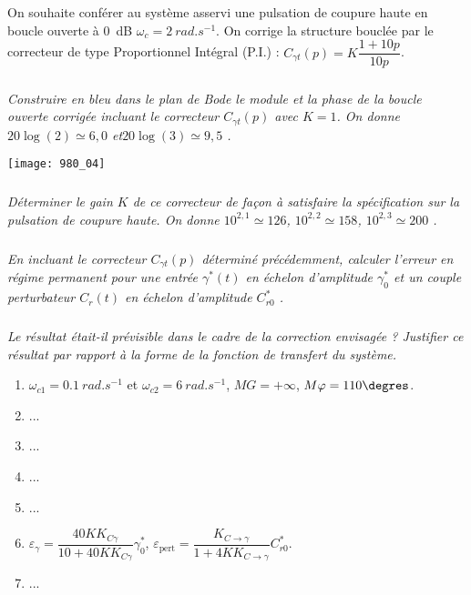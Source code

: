 On souhaite conférer au système asservi une pulsation de coupure haute en boucle ouverte à \SI{0}{dB}
$\omega_c = \SI{2}{rad.s^{-1}}$. On corrige la structure bouclée par le correcteur de type Proportionnel Intégral (P.I.) :
$C_{\gamma t}(p)=K\dfrac{1+10p}{10p}$.


\subparagraph{}
\textit{Construire en bleu dans le plan de Bode le module et la phase de la boucle ouverte corrigée incluant le correcteur 
$C_{\gamma t} (p)$ avec $K = 1$. On donne $20 \log( 2) \simeq  6,0$ et$ 20 \log(3) \simeq 9,5$ .}
\ifprof
\begin{corrige}
\end{corrige}
\else
\fi


\begin{center}
\texttt{[image: 980\_04]}%
\end{center}


\subparagraph{}
\textit{Déterminer le gain $K$ de ce correcteur de façon à satisfaire la spécification sur la pulsation de
coupure haute. On donne $10^{2,1}\simeq  126$, $10^{2,2}\simeq  158$, $10^{2,3}\simeq  200$ .}
\ifprof
\begin{corrige}
\end{corrige}
\else
\fi



\subparagraph{}
\textit{En incluant le correcteur $C_{\gamma t} (p)$ déterminé précédemment, calculer l'erreur en régime
permanent pour une entrée $\gamma ^* (t)$ en échelon d’amplitude $\gamma^*_0$ et un couple perturbateur $C_r (t)$ en
échelon d’amplitude $C^*_{r0}$ .}
\ifprof
\begin{corrige}
\end{corrige}
\else
\fi


\subparagraph{}
\textit{Le résultat était-il prévisible dans le cadre de la correction envisagée ? 
Justifier ce résultat par rapport à la forme de la fonction de transfert du système.}
\ifprof
\begin{corrige}
\end{corrige}
\else
\fi

\begin{enumerate}
\item $\omega_{c1} = \SI{0,1}{rad.s^{-1}}$ et $\omega_{c2} = \SI{6}{rad.s^{-1}}$, $MG=+\infty$, $M\varphi = 110\degres$.
\item ...
\item ...
\item ...
\item ...
\item $\varepsilon_{\gamma} = \dfrac{40 K K_{C \gamma}}{10+40 K K_{C \gamma}}\gamma_{0}^*$, 
$\varepsilon_{\text{pert}} = \dfrac{ K_{C \rightarrow \gamma}}{1+4K K_{C \rightarrow \gamma}}C_{r0}^*$.
\item ...
\end{enumerate}